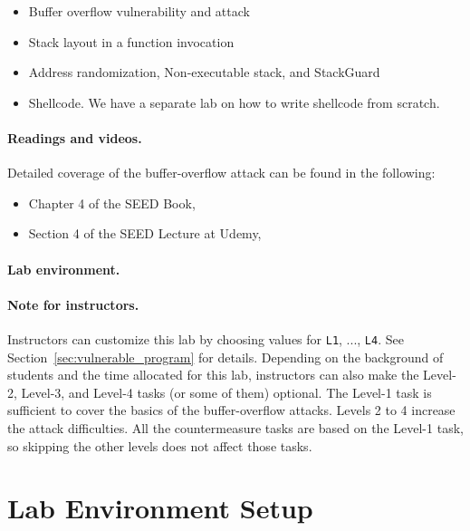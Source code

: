 \begin{itemize}[noitemsep]
\item Buffer overflow vulnerability and attack
\item Stack layout in a function invocation
\item Address randomization, Non-executable stack, and  StackGuard
\item Shellcode. We have a separate lab on how to write shellcode 
from scratch.
\end{itemize}



\paragraph{Readings and videos.}
Detailed coverage of the buffer-overflow attack can be found in the following:

\begin{itemize}
\item Chapter 4 of the SEED Book, \seedbook
\item Section 4 of the SEED Lecture at Udemy, \seedcsvideo
\end{itemize}


\paragraph{Lab environment.} \seedenvironmentC


\paragraph{Note for instructors.}
Instructors can customize this lab by choosing values
for \texttt{L1}, ..., \texttt{L4}. See
Section~\ref{sec:vulnerable_program} for details.
Depending on the background of students and the time allocated
for this lab, instructors can also make the
Level-2, Level-3, and Level-4 tasks (or some of them) optional.
The Level-1 task is sufficient to cover the basics of
the buffer-overflow attacks. Levels 2 to 4
increase the attack difficulties.
All the countermeasure tasks are based on the Level-1 task,
so skipping the other levels does not affect those tasks.




\section{Lab Environment Setup} 


